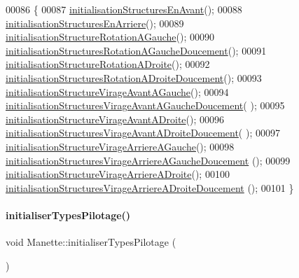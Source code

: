 \begin{DoxyCode}
00086 \{
00087     \hyperlink{class_manette_afd5504555886e0abf89347b4f8d57fe0}{initialisationStructuresEnAvant}();
00088     \hyperlink{class_manette_ae4379b4f09192b83219de5aaa548fda0}{initialisationStructuresEnArriere}();
00089     \hyperlink{class_manette_a9c1348e7b4c4cc071c9b8bac79f0eeab}{initialisationStructureRotationAGauche}();
00090     \hyperlink{class_manette_a35242782669d6d2cf88f2b5dbd9b0b73}{initialisationStructuresRotationAGaucheDoucement}();
00091     \hyperlink{class_manette_a34e37141425dd6d62bcb5954312705c9}{initialisationStructureRotationADroite}();
00092     \hyperlink{class_manette_aba0348198bad2dff52fe71684d73c2df}{initialisationStructuresRotationADroiteDoucement}();
00093     \hyperlink{class_manette_aa02a2dfa49318e1043b52dd103fa1795}{initialisationStructureVirageAvantAGauche}();
00094     \hyperlink{class_manette_ac01c5ff122f042497658f00d3df9e859}{initialisationStructuresVirageAvantAGaucheDoucement}(
      );
00095     \hyperlink{class_manette_ad41918ccfeee9d80146a74678173cee8}{initialisationStructureVirageAvantADroite}();
00096     \hyperlink{class_manette_ac77d5caae62d9248edd5e26f15176f34}{initialisationStructuresVirageAvantADroiteDoucement}(
      );
00097     \hyperlink{class_manette_ad1d146fe52ff367fd2a7fe3c94c165e4}{initialisationStructureVirageArriereAGauche}();
00098     \hyperlink{class_manette_a345202d80c6b1370284103878e690363}{initialisationStructuresVirageArriereAGaucheDoucement}
      ();
00099     \hyperlink{class_manette_a9097a15ce44cb2535ce6e6099a8b2095}{initialisationStructureVirageArriereADroite}();
00100     \hyperlink{class_manette_a118d9481c3eecb4dcc58f8798893fa85}{initialisationStructuresVirageArriereADroiteDoucement}
      ();
00101 \}
\end{DoxyCode}
\mbox{\label{class_manette_ab20afdb190b24126e54d4f80af0bf310}} 
\paragraph{\texorpdfstring{initialiser\+Types\+Pilotage()}{initialiserTypesPilotage()}}
{\footnotesize\ttfamily void Manette\+::initialiser\+Types\+Pilotage (\begin{DoxyParamCaption}{ }\end{DoxyParamCaption})\hspace{0.3cm}{\ttfamily [private]}}



